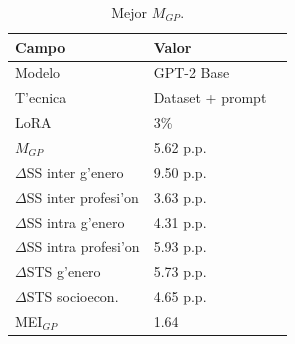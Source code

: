 \begin{table}[H]
\centering\small
\caption{Mejor $M_{GP}$.}
\label{tab:gp_mejor}
\begin{tabular}{@{}llr@{}}
\toprule
\textbf{Campo} & \textbf{Valor} \\
\midrule
Modelo & GPT-2 Base \\
T'ecnica & Dataset + prompt \\
LoRA & 3\% \\
$M_{GP}$ & 5.62 p.p. \\
$\Delta$SS inter g'enero & 9.50 p.p. \\
$\Delta$SS inter profesi'on & 3.63 p.p. \\
$\Delta$SS intra g'enero & 4.31 p.p. \\
$\Delta$SS intra profesi'on & 5.93 p.p. \\
$\Delta$STS g'enero & 5.73 p.p. \\
$\Delta$STS socioecon. & 4.65 p.p. \\
MEI$_{GP}$ & 1.64 \\
\bottomrule
\end{tabular}
\end{table}